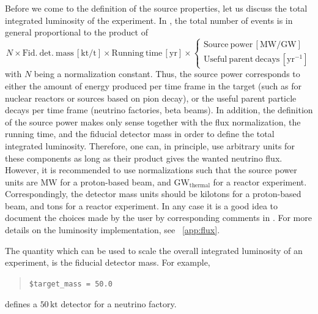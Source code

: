 Before we come to the definition of the source properties, let us discuss
the total integrated luminosity of the experiment. In \GLOBES , the total number of events is in general proportional to the product of
\begin{equation}
N \times \mathrm{Fid.~det.~mass}\,\left[\mathrm{kt/t}\right]\times 
\mathrm{Running~time} \,\left[\mathrm{yr}\right]\times\left\{ \begin{array}{c}
\mathrm{Source~power}\,\left[\mathrm{MW/GW}\right]\\
\mathrm{Useful~parent~decays}\,\left[\mathrm{yr}^{-1}\right]
\end{array}\right.
\end{equation}
with $N$ being a normalization constant.
Thus, the source power corresponds to either the amount of energy produced per time frame in the target (such as for nuclear reactors or sources based on pion decay), or the useful parent particle decays per time frame (neutrino factories, beta beams). In addition, the definition of the source power makes only sense together with the flux normalization, the running time, and the fiducial detector mass in order to define the total integrated luminosity. Therefore, one can, in principle, use arbitrary units for these components as long as their product gives the wanted neutrino flux. However, it is
recommended to use normalizations such that the source power units are $\mathrm{MW}$ for a proton-based beam, and $\mathrm{GW}_\mathrm{thermal}$ for a reactor experiment. Correspondingly, the detector mass units should be kilotons for a proton-based beam, and tons for a reactor experiment. In any case it is a good
idea to document the choices made by the user by corresponding comments
in \AEDL. For more details on the luminosity implementation, see \App~\ref{app:flux}.

The quantity which can be used to scale the overall integrated luminosity of an experiment, is the fiducial detector mass. For example,
\begin{quote}
{\tt \$target\_mass = 50.0 }
\end{quote}
defines a $50 \, \mathrm{kt}$ detector for a neutrino factory.

